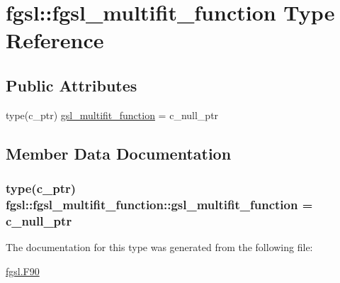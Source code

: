 \hypertarget{structfgsl_1_1fgsl__multifit__function}{}\section{fgsl\+:\+:fgsl\+\_\+multifit\+\_\+function Type Reference}
\label{structfgsl_1_1fgsl__multifit__function}
\subsection*{Public Attributes}
\begin{DoxyCompactItemize}
\item 
type(c\+\_\+ptr) \hyperlink{structfgsl_1_1fgsl__multifit__function_a81b590be8daf3e68d5a568a1b9cd9d17}{gsl\+\_\+multifit\+\_\+function} = c\+\_\+null\+\_\+ptr
\end{DoxyCompactItemize}


\subsection{Member Data Documentation}
\hypertarget{structfgsl_1_1fgsl__multifit__function_a81b590be8daf3e68d5a568a1b9cd9d17}{}
\subsubsection[{gsl\+\_\+multifit\+\_\+function}]{\setlength{\rightskip}{0pt plus 5cm}type(c\+\_\+ptr) fgsl\+::fgsl\+\_\+multifit\+\_\+function\+::gsl\+\_\+multifit\+\_\+function = c\+\_\+null\+\_\+ptr}\label{structfgsl_1_1fgsl__multifit__function_a81b590be8daf3e68d5a568a1b9cd9d17}


The documentation for this type was generated from the following file\+:\begin{DoxyCompactItemize}
\item 
\hyperlink{fgsl_8F90}{fgsl.\+F90}\end{DoxyCompactItemize}
